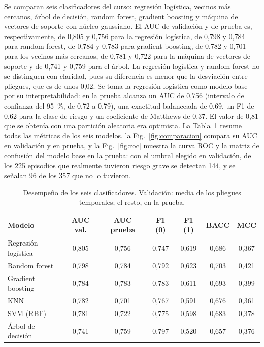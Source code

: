 \documentclass[journal]{IEEEtran}
\begin{document}
Se comparan seis clasificadores del curso: regresión logística, vecinos más cercanos, árbol de decisión, random forest, gradient boosting y máquina de vectores de soporte con núcleo gaussiano. El AUC de validación y de prueba es, respectivamente, de 0,805 y 0,756 para la regresión logística, de 0,798 y 0,784 para random forest, de 0,784 y 0,783 para gradient boosting, de 0,782 y 0,701 para los vecinos más cercanos, de 0,781 y 0,722 para la máquina de vectores de soporte y de 0,741 y 0,759 para el árbol. La regresión logística y random forest no se distinguen con claridad, pues su diferencia es menor que la desviación entre pliegues, que es de unos 0,02. Se toma la regresión logística como modelo base por su interpretabilidad: en la prueba alcanza un AUC de 0,756 (intervalo de confianza del 95~\%, de 0,72 a 0,79), una exactitud balanceada de 0,69, un F1 de 0,62 para la clase de riesgo y un coeficiente de Matthews de 0,37. El valor de 0,81 que se obtenía con una partición aleatoria era optimista. La Tabla~\ref{tab:modelos} resume todas las métricas de los seis modelos, la Fig.~\ref{fig:comparacion} compara su AUC en validación y en prueba, y la Fig.~\ref{fig:roc} muestra la curva ROC y la matriz de confusión del modelo base en la prueba: con el umbral elegido en validación, de los 225 episodios que realmente tuvieron riesgo grave se detectan 144, y se señalan 96 de los 357 que no lo tuvieron.
\begin{table}[!t]
\caption{Desempeño de los seis clasificadores. Validación: media de los pliegues temporales; el resto, en la prueba.}
\label{tab:modelos}
\centering
\scriptsize
\setlength{\tabcolsep}{3pt}
\begin{tabular}{@{}lcccccc@{}}
\toprule
Modelo & AUC val. & AUC prueba & F1 (0) & F1 (1) & BACC & MCC \\
\midrule
Regresión logística & 0,805 & 0,756 & 0,747 & 0,619 & 0,686 & 0,367 \\
Random forest & 0,798 & 0,784 & 0,792 & 0,623 & 0,703 & 0,421 \\
Gradient boosting & 0,784 & 0,783 & 0,783 & 0,611 & 0,693 & 0,399 \\
KNN & 0,782 & 0,701 & 0,767 & 0,591 & 0,676 & 0,361 \\
SVM (RBF) & 0,781 & 0,722 & 0,775 & 0,598 & 0,683 & 0,378 \\
Árbol de decisión & 0,741 & 0,759 & 0,797 & 0,520 & 0,657 & 0,376 \\
\bottomrule
\end{tabular}
\end{table}
\end{document}
